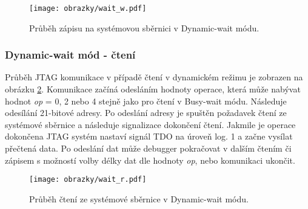 \begin{figure}[!h]
  \begin{center}
    \texttt{[image: obrazky/wait\_w.pdf]}
  \end{center}
  \caption{Průběh zápisu na systémovou sběrnici v Dynamic-wait módu.}
	\label{fig:wait_w}
\end{figure}

\subsubsection{Dynamic-wait mód - čtení} 
Průběh JTAG komunikace v případě čtení v dynamickém režimu je zobrazen na obrázku \ref{fig:wait_r}. Komunikace začíná odesláním hodnoty operace, která může nabývat hodnot \textit{op} = 0, 2 nebo 4 stejně jako pro čtení v Busy-wait módu. Následuje odesílání 21-bitové adresy. Po odeslání adresy je spuštěn požadavek čtení ze systémové sběrnice a následuje signalizace dokončení čtení. Jakmile je operace dokončena \acs{JTAG} systém nastaví signál \acs{TDO} na úroveň log. 1 a začne vysílat přečtená data. Po odeslání dat může debugger pokračovat v dalším čtením či zápisem s možností volby délky dat dle hodnoty \textit{op}, nebo komunikaci ukončit. 

\begin{figure}[!h]
  \begin{center}
    \texttt{[image: obrazky/wait\_r.pdf]}
  \end{center}
  \caption{Průběh čtení ze systémové sběrnice v Dynamic-wait módu.}
	\label{fig:wait_r}
\end{figure}